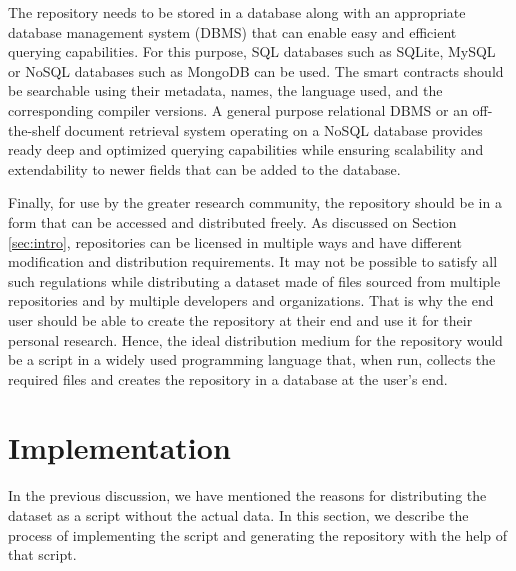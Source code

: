 \documentclass[10pt,conference]{IEEEtran}
\begin{document}
	The repository needs to be stored in a database along with an appropriate database management system (DBMS) that can enable easy and efficient querying capabilities. For this purpose, SQL databases such as SQLite, MySQL or NoSQL databases such as MongoDB can be used.  The smart contracts should be searchable using their metadata, names, the language used, and the corresponding compiler versions. A general purpose relational DBMS or an off-the-shelf document retrieval system operating on a NoSQL database provides ready deep and optimized querying capabilities while ensuring scalability and extendability to newer fields that can be added to the database.
	
	Finally, for use by the greater research community, the repository should be in a form that can be accessed and distributed freely. As discussed on Section \ref{sec:intro}, repositories can be licensed in multiple ways and have different modification and distribution requirements. It may not be possible to satisfy all such regulations while distributing a dataset made of files sourced from multiple repositories and by multiple developers and organizations. That is why the end user should be able to create the repository at their end and use it for their personal research. Hence, the ideal distribution medium for the repository would be a script in a widely used programming language that, when run, collects the required files and creates the repository in a database at the user's end.
	
	\section{Implementation}
	\label{sec:implementation}
	
	In the previous discussion, we have mentioned the reasons for distributing the dataset as a script without the actual data. In this section, we describe the process of implementing the script and generating the repository with the help of that script. 
	
\end{document}
